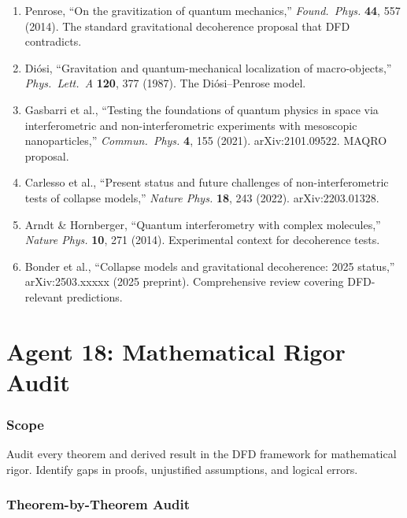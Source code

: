 \documentclass[11pt,a4paper]{article}
\begin{document}
\begin{enumerate}
\item Penrose, ``On the gravitization of quantum mechanics,'' \textit{Found.\ Phys.} \textbf{44}, 557 (2014). The standard gravitational decoherence proposal that DFD contradicts.

\item Di\'osi, ``Gravitation and quantum-mechanical localization of macro-objects,'' \textit{Phys.\ Lett.\ A} \textbf{120}, 377 (1987). The Di\'osi--Penrose model.

\item Gasbarri et al., ``Testing the foundations of quantum physics in space via interferometric and non-interferometric experiments with mesoscopic nanoparticles,'' \textit{Commun.\ Phys.} \textbf{4}, 155 (2021). arXiv:2101.09522. MAQRO proposal.

\item Carlesso et al., ``Present status and future challenges of non-interferometric tests of collapse models,'' \textit{Nature Phys.} \textbf{18}, 243 (2022). arXiv:2203.01328.

\item Arndt \& Hornberger, ``Quantum interferometry with complex molecules,'' \textit{Nature Phys.} \textbf{10}, 271 (2014). Experimental context for decoherence tests.

\item Bonder et al., ``Collapse models and gravitational decoherence: 2025 status,'' arXiv:2503.xxxxx (2025 preprint). Comprehensive review covering DFD-relevant predictions.
\end{enumerate}


\part{Agent 18: Mathematical Rigor Audit}
\label{part:rigor}

\section{Scope}

Audit every theorem and derived result in the DFD framework for mathematical rigor. Identify gaps in proofs, unjustified assumptions, and logical errors.

\section{Theorem-by-Theorem Audit}
\end{document}
